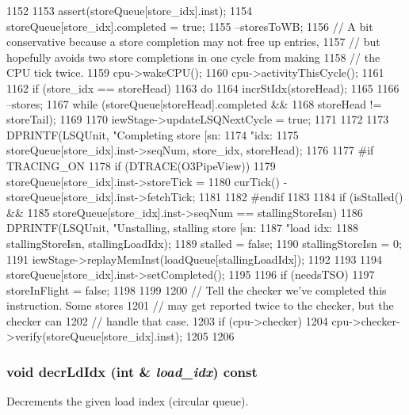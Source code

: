 \begin{DoxyCode}
1152 {
1153     assert(storeQueue[store_idx].inst);
1154     storeQueue[store_idx].completed = true;
1155     --storesToWB;
1156     // A bit conservative because a store completion may not free up entries,
1157     // but hopefully avoids two store completions in one cycle from making
1158     // the CPU tick twice.
1159     cpu->wakeCPU();
1160     cpu->activityThisCycle();
1161 
1162     if (store_idx == storeHead) {
1163         do {
1164             incrStIdx(storeHead);
1165 
1166             --stores;
1167         } while (storeQueue[storeHead].completed &&
1168                  storeHead != storeTail);
1169 
1170         iewStage->updateLSQNextCycle = true;
1171     }
1172 
1173     DPRINTF(LSQUnit, "Completing store [sn:%
1174             "idx:%
1175             storeQueue[store_idx].inst->seqNum, store_idx, storeHead);
1176 
1177 #if TRACING_ON
1178     if (DTRACE(O3PipeView)) {
1179         storeQueue[store_idx].inst->storeTick =
1180             curTick() - storeQueue[store_idx].inst->fetchTick;
1181     }
1182 #endif
1183 
1184     if (isStalled() &&
1185         storeQueue[store_idx].inst->seqNum == stallingStoreIsn) {
1186         DPRINTF(LSQUnit, "Unstalling, stalling store [sn:%
1187                 "load idx:%
1188                 stallingStoreIsn, stallingLoadIdx);
1189         stalled = false;
1190         stallingStoreIsn = 0;
1191         iewStage->replayMemInst(loadQueue[stallingLoadIdx]);
1192     }
1193 
1194     storeQueue[store_idx].inst->setCompleted();
1195 
1196     if (needsTSO) {
1197         storeInFlight = false;
1198     }
1199 
1200     // Tell the checker we've completed this instruction.  Some stores
1201     // may get reported twice to the checker, but the checker can
1202     // handle that case.
1203     if (cpu->checker) {
1204         cpu->checker->verify(storeQueue[store_idx].inst);
1205     }
1206 }
\end{DoxyCode}
\hypertarget{classLSQUnit_a313eca7abdfb7c6642078e21bc49a968}{
\subsubsection[{decrLdIdx}]{\setlength{\rightskip}{0pt plus 5cm}void decrLdIdx (int \& {\em load\_\-idx}) const}}
\label{classLSQUnit_a313eca7abdfb7c6642078e21bc49a968}
Decrements the given load index (circular queue). 


